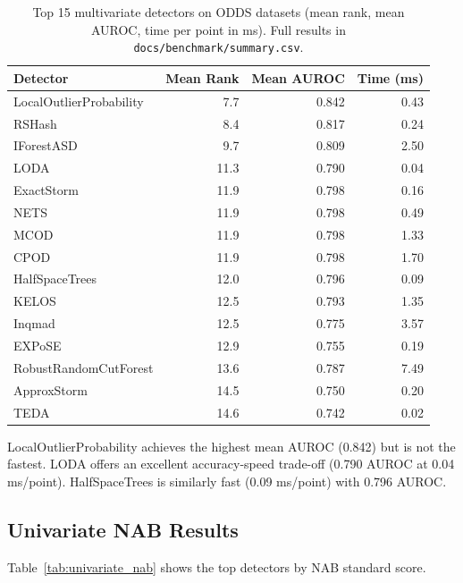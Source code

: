 \documentclass[11pt,a4paper]{article}
\begin{document}
\begin{table}[htbp]
\centering
\caption{Top 15 multivariate detectors on ODDS datasets (mean rank, mean AUROC, time per point in ms). Full results in \texttt{docs/benchmark/summary.csv}.}
\label{tab:multivariate_summary}
\begin{tabular}{lrrr}
\toprule
Detector & Mean Rank & Mean AUROC & Time (ms) \\
\midrule
LocalOutlierProbability & 7.7 & 0.842 & 0.43 \\
RSHash & 8.4 & 0.817 & 0.24 \\
IForestASD & 9.7 & 0.809 & 2.50 \\
LODA & 11.3 & 0.790 & 0.04 \\
ExactStorm & 11.9 & 0.798 & 0.16 \\
NETS & 11.9 & 0.798 & 0.49 \\
MCOD & 11.9 & 0.798 & 1.33 \\
CPOD & 11.9 & 0.798 & 1.70 \\
HalfSpaceTrees & 12.0 & 0.796 & 0.09 \\
KELOS & 12.5 & 0.793 & 1.35 \\
Inqmad & 12.5 & 0.775 & 3.57 \\
EXPoSE & 12.9 & 0.755 & 0.19 \\
RobustRandomCutForest & 13.6 & 0.787 & 7.49 \\
ApproxStorm & 14.5 & 0.750 & 0.20 \\
TEDA & 14.6 & 0.742 & 0.02 \\
\bottomrule
\end{tabular}
\end{table}

LocalOutlierProbability achieves the highest mean AUROC (0.842) but is not the fastest. LODA offers an excellent accuracy-speed trade-off (0.790 AUROC at 0.04 ms/point). HalfSpaceTrees is similarly fast (0.09 ms/point) with 0.796 AUROC.

\subsection{Univariate NAB Results}
\label{sec:results_nab}

Table~\ref{tab:univariate_nab} shows the top detectors by NAB standard score.
\end{document}
